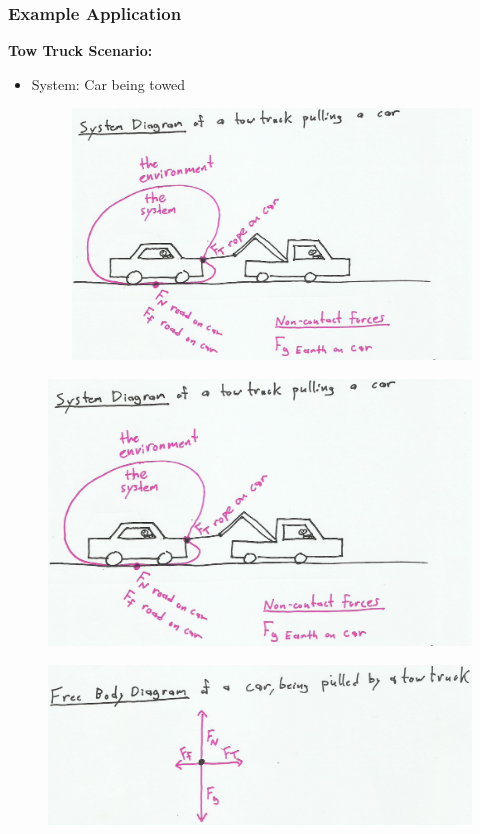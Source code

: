 \documentclass{beamer}
\begin{document}
\begin{frame}
\frametitle{Example Application}
\textbf{Tow Truck Scenario:}
\begin{itemize}
    \item System: Car being towed
\begin{figure}[H]
    \centering
    \includegraphics[width=1\linewidth]{CH4/towtruck.png}
\end{figure}
\end{itemize}

\end{frame}

\begin{frame}
\begin{figure}[H]
    \centering
    \includegraphics[width=0.7\linewidth]{CH4/towtruck.png}
\end{figure}

\begin{figure}[H]
    \centering
    \includegraphics[width=0.7\linewidth]{CH4/CraigFBD.png}
\end{figure}
\end{frame}
\end{document}
